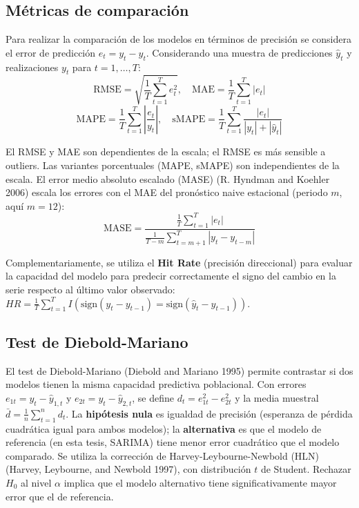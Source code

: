 \documentclass[
  12pt, a4paper, oneside]{article}
\begin{document}
\subsection{Métricas de comparación}\label{muxe9tricas-de-comparaciuxf3n}

Para realizar la comparación de los modelos en términos de precisión se considera el error de predicción \(e_t = y_t - \hat{y}_t\). Considerando una muestra de predicciones \(\hat{y}_t\) y realizaciones \(y_t\) para \(t = 1, \ldots, T\):
\begin{equation}
\text{RMSE} = \sqrt{\frac{1}{T}\sum_{t=1}^{T} e_t^2}, \quad \text{MAE} = \frac{1}{T}\sum_{t=1}^{T} |e_t|
\end{equation}
\begin{equation}
\text{MAPE} = \frac{1}{T}\sum_{t=1}^{T} \left|\frac{e_t}{y_t}\right|, \quad \text{sMAPE} = \frac{1}{T}\sum_{t=1}^{T} \frac{|e_t|}{|y_t| + |\hat{y}_t|}
\end{equation}

El RMSE y MAE son dependientes de la escala; el RMSE es más sensible a outliers. Las variantes porcentuales (MAPE, sMAPE) son independientes de la escala. El error medio absoluto escalado (MASE) (R. Hyndman and Koehler 2006) escala los errores con el MAE del pronóstico naive estacional (periodo \(m\), aquí \(m=12\)):
\begin{equation}
\text{MASE} = \frac{\frac{1}{T}\sum_{t=1}^{T}|e_t|}{\frac{1}{T-m}\sum_{t=m+1}^{T}|y_t - y_{t-m}|}
\end{equation}

Complementariamente, se utiliza el \textbf{Hit Rate} (precisión direccional) para evaluar la capacidad del modelo para predecir correctamente el signo del cambio en la serie respecto al último valor observado: \(HR = \frac{1}{T}\sum_{t=1}^{T} I(\text{sign}(y_t - y_{t-1}) = \text{sign}(\hat{y}_t - y_{t-1}))\).

\subsection{Test de Diebold-Mariano}\label{test-de-diebold-mariano}

El test de Diebold-Mariano (Diebold and Mariano 1995) permite contrastar si dos modelos tienen la misma capacidad predictiva poblacional. Con errores \(e_{1t} = y_t - \hat{y}_{1,t}\) y \(e_{2t} = y_t - \hat{y}_{2,t}\), se define \(d_t = e_{1t}^2 - e_{2t}^2\) y la media muestral \(\bar{d} = \frac{1}{n}\sum_{t=1}^{n} d_t\). La \textbf{hipótesis nula} es igualdad de precisión (esperanza de pérdida cuadrática igual para ambos modelos); la \textbf{alternativa} es que el modelo de referencia (en esta tesis, SARIMA) tiene menor error cuadrático que el modelo comparado. Se utiliza la corrección de Harvey-Leybourne-Newbold (HLN) (Harvey, Leybourne, and Newbold 1997), con distribución \(t\) de Student. Rechazar \(H_0\) al nivel \(\alpha\) implica que el modelo alternativo tiene significativamente mayor error que el de referencia.
\end{document}
